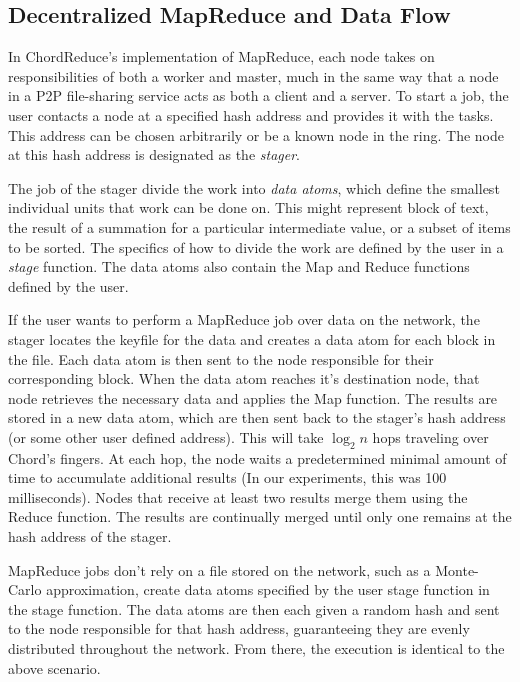 

\subsection{Decentralized MapReduce and Data Flow} 
In ChordReduce's implementation of MapReduce, each node takes on responsibilities of both a worker and master, much in the same way that a node in a P2P file-sharing service acts as both a client and a server.  To start a job, the user contacts a node at a specified hash address and provides it with the tasks.  This address can be chosen arbitrarily or be a known node in the ring. The node at this hash address is designated as the \textit{stager}.  

The job of the stager divide the work into \emph{data atoms}, which define the smallest individual units that work can be done on. This might represent block of text, the result of a summation for a particular intermediate value, or a subset of items to be sorted. The specifics of how to divide the work are defined by the user in a \emph{stage} function.  The data atoms also contain the Map and Reduce functions defined by the user.

If the user wants to perform a MapReduce job over data on the network, the stager locates the keyfile for the data and creates a data atom for each block in the file.  Each data atom is then sent to the node responsible for their corresponding block.  When the data atom reaches it's destination node, that node retrieves the necessary data and applies the Map function.  The results are stored in a new data atom,  which are then sent back to the stager's hash address (or some other user defined address).  This will take $\log_{2} n$ hops traveling over Chord's fingers.  At each hop, the node waits a predetermined minimal amount of time to accumulate additional results (In our experiments, this was 100 milliseconds).  Nodes that receive at least two results merge them using the Reduce function.  The results are continually merged until only one remains at the hash address of the stager. 


MapReduce jobs don't rely on a file stored on the network, such as a Monte-Carlo approximation, create data atoms specified by the user stage function in the stage function.  The data atoms are then each given a random hash and sent to the node responsible for that hash address, guaranteeing they are evenly distributed throughout the network. From there, the execution is identical to the above scenario.


